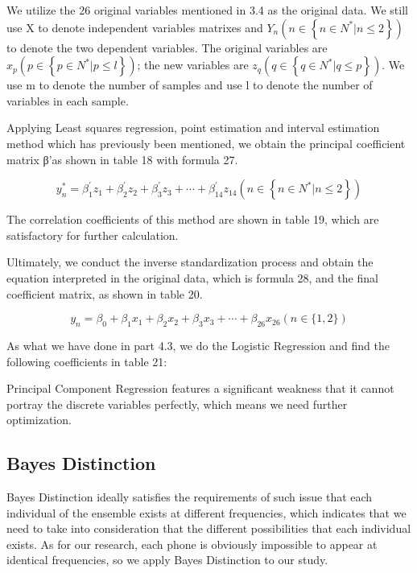 We utilize the 26 original variables mentioned in 3.4 as the original data. We still use X to denote independent variables matrixes and $Y _ { n } \left( n \in \left\{ n \in N ^ { * } | n \leq 2 \right\} \right)$ to denote the two dependent variables. The original variables are $x _ { p } \left( p \in \left\{ p \in N ^ { * } | p \leq l \right\} \right)$; the new variables are $z _ { q } \left( q \in \left\{ q \in N ^ { * } | q \leq p \right\} \right)$. We use m to denote the number of samples and use l to denote the number of variables in each sample. 

Applying Least squares regression, point estimation and interval estimation method which has previously been mentioned, we obtain the principal coefficient matrix β'as shown in table 18 with formula 27. 

\begin{equation}
y _ { n } ^ { * } = \beta _ { 1 } ^ { \prime } z _ { 1 } + \beta _ { 2 } ^ { \prime } z _ { 2 } + \beta _ { 3 } ^ { \prime } z _ { 3 } + \cdots + \beta _ { 14 } ^ { \prime } z _ { 14 } \left( n \in \left\{ n \in N ^ { * } | n \leq 2 \right\} \right)
\end{equation}

The correlation coefficients of this method are shown in table 19, which are satisfactory for further calculation. 

Ultimately, we conduct the inverse standardization process and obtain the equation interpreted in the original data, which is formula 28, and the final coefficient matrix, as shown in table 20. 

\begin{equation}
y _ { n } = \beta _ { 0 } + \beta _ { 1 } x _ { 1 } + \beta _ { 2 } x _ { 2 } + \beta _ { 3 } x _ { 3 } + \cdots + \beta _ { 26 } x _ { 26 } ( n \in \{ 1,2 \} )
\end{equation}

As what we have done in part 4.3, we do the Logistic Regression and find the following coefficients in table 21: 

Principal Component Regression features a significant weakness that it cannot portray the discrete variables perfectly, which means we need further optimization.

\subsection{Bayes Distinction}

Bayes Distinction ideally satisfies the requirements of such issue that each individual of the ensemble exists at different frequencies, which indicates that we need to take into consideration that the different possibilities that each individual exists. As for our research, each phone is obviously impossible to appear at identical frequencies, so we apply Bayes Distinction to our study. 

